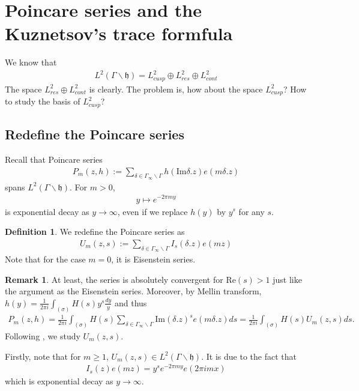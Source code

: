 \documentclass[11pt,reqno]{amsart}
\newcommand{\bna}{\begin{eqnarray*}}
\newcommand{\ena}{\end{eqnarray*}}
\newcommand{\mk}{\mathfrak}
\def\re{{\mathrm{Re}}}
\def\im{{\mathrm{Im}}}
\theoremstyle{definition}
\newtheorem{definition}[lemma]{Definition}
\newtheorem{remark}{Remark}
\begin{document}
\section{Poincare series and the Kuznetsov's trace formfula}
We know that
\bna
L^2(\Gamma\backslash\mk h)=L^2_{cusp}\oplus L^2_{res}\oplus L^2_{cont}
\ena
The space $L^2_{res}\oplus L^2_{cont}$ is clearly.
The problem is, how about the space $L^2_{cusp}$? How to study
the basis of $L^2_{cusp}$?

\subsection{Redefine the Poincare series}
Recall that Poincare series
\bna
P_m(z,h):=\sum_{\delta\in\Gamma_\infty\backslash\Gamma}h(\im \delta.z)e(m\delta.z)
\ena
spans $L^2(\Gamma\backslash\mk h)$. For $m>0$,
\bna
y\mapsto e^{-2\pi my}
\ena
is exponential decay as $y\rightarrow\infty$, even if we replace $h(y)$ by $y^s$ for any $s$.


\begin{definition}We redefine the Poincare series as
\bna
U_m(z,s):=\sum_{\delta\in\Gamma_\infty\backslash\Gamma}I_s(\delta.z)e(mz)
\ena
Note that for the case $m=0$, it is Eisenstein series.
\end{definition}

\begin{remark}
At least, the series is absolutely convergent for $\re(s)>1$ just like the argument as the Eisenstein series.
Moreover, by Mellin transform, $h(y)=\frac{1}{2\pi i}\int_{(\sigma)}H(s)y^s\frac{dy}{y}$ and thus
\bna
P_m(z,h)=\frac{1}{2\pi i}\int_{(\sigma)} H(s)\sum_{\delta\in\Gamma_\infty\backslash\Gamma}\im(\delta.z)^{s} e(m\delta.z)ds
=\frac{1}{2\pi i}\int_{(\sigma)}H(s) U_m(z,s)ds.
\ena
Following \cite{DeIw1982}, we study $U_m(z,s)$.
\end{remark}
Firstly, note that for $m\geq 1$, $U_m(z,s)\in L^2(\Gamma\backslash\mk h)$.
It is due to the fact that
\bna
I_s(z)e(mz)=y^{s}e^{-2\pi my} e(2\pi i m x)
\ena
which is exponential decay as $y\rightarrow\infty$.
\end{document}
